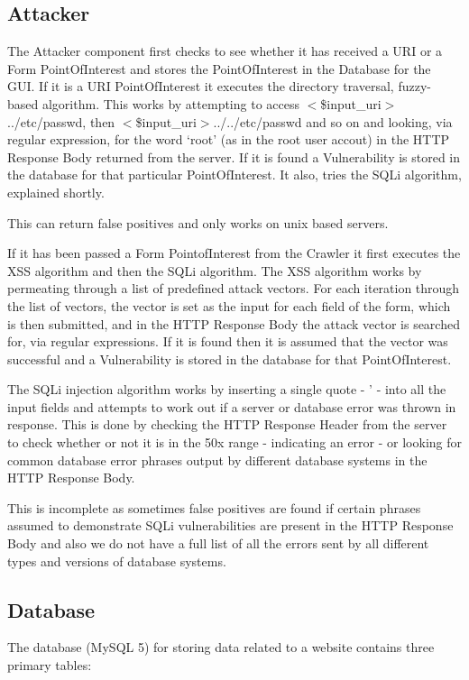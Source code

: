 \documentclass[12pt,a4paper]{article}
\begin{document}
\subsection{Attacker}
The Attacker component first checks to see whether it has received a URI or a Form PointOfInterest and stores the PointOfInterest in the Database for the GUI.  If it is a URI PointOfInterest it executes the directory traversal, fuzzy-based algorithm.  This works by attempting to access $<$\$input\_uri$>$../etc/passwd, then $<$\$input\_uri$>$../../etc/passwd and so on and looking, via regular expression, for the word `root' (as in the root user accout) in the HTTP Response Body returned from the server.  If it is found a Vulnerability is stored in the database for that particular PointOfInterest.  It also, tries the SQLi algorithm, explained shortly.

This can return false positives and only works on unix based servers.

If it has been passed a Form PointofInterest from the Crawler it first executes the XSS algorithm and then the SQLi algorithm.  The XSS algorithm works by permeating through a list of predefined attack vectors. For each iteration through the list of vectors, the vector is set as the input for each field of the form, which is then submitted, and in the HTTP Response Body the attack vector is searched for, via regular expressions.  If it is found then it is assumed that the vector was successful and a Vulnerability is stored in the database for that PointOfInterest.

The SQLi injection algorithm works by inserting a single quote - ' - into all the input fields and attempts to work out if a server or database error was thrown in response.  This is done by checking the HTTP Response Header from the server to check whether or not it is in the 50x range - indicating an error - or looking for common database error phrases output by different database systems in the HTTP Response Body.  

This is incomplete as sometimes false positives are found if certain phrases assumed to demonstrate SQLi vulnerabilities are present in the HTTP Response Body and also we do not have a full list of all the errors sent by all different types and versions of database systems.

\subsection{Database}
The database (MySQL 5) for storing data related to a website contains three primary tables:
\end{document}
